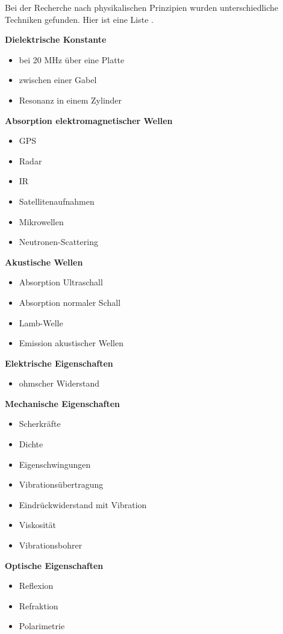 Bei der Recherche nach physikalischen Prinzipien wurden unterschiedliche Techniken gefunden. Hier ist eine Liste .


\begin{multicols}{2}
\textbf{Dielektrische Konstante}
\begin{itemize}
\item bei 20 MHz über eine Platte
\item zwischen einer Gabel
\item Resonanz in einem Zylinder
\end{itemize}

\textbf{Absorption elektromagnetischer Wellen}
\begin{itemize}
\item GPS
\item Radar
\item IR
\item Satellitenaufnahmen
\item Mikrowellen
\item Neutronen-Scattering
\end{itemize}

\textbf{Akustische Wellen}
\begin{itemize}
\item Absorption Ultraschall
\item Absorption normaler Schall
\item Lamb-Welle
\item Emission akustischer Wellen
\end{itemize}


\textbf{Elektrische Eigenschaften}
\begin{itemize}
\item ohmscher Widerstand
\end{itemize}

\textbf{Mechanische Eigenschaften}
\begin{itemize}
\item Scherkräfte
\item Dichte
\item Eigenschwingungen
\item Vibrationsübertragung
\item Eindrückwiderstand mit Vibration
\item Viskosität
\item Vibrationsbohrer
\end{itemize}


\textbf{Optische Eigenschaften}
\begin{itemize}
\item Reflexion
\item Refraktion
\item Polarimetrie
\end{itemize}


\end{multicols}
